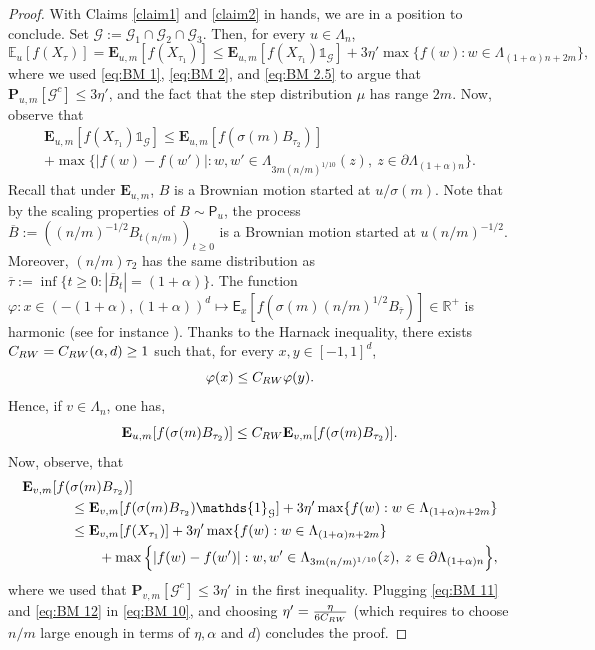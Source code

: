 \documentclass[11pt,a4paper]{article}
\numberwithin{equation}{section}
\theoremstyle{plain}
\theoremstyle{definition}
\begin{document}
\begin{proof}
With Claims \ref{claim1} and \ref{claim2} in hands, we are in a position to conclude. Set $\mathcal G:=\mathcal G_1\cap \mathcal G_2\cap \mathcal G_3$. Then, for every $u \in \Lambda_n$,
\begin{equation}
	\mathbb E_u[f(X_\tau)]=\mathbf E_{u,m}[f(X_{\tau_1})]\leq \mathbf E_{u,m}[f(X_{\tau_1})\mathds{1}_{\mathcal G}]+3\eta'\max\{f(w):w\in \Lambda_{(1+\alpha)n+2m}\},
\end{equation}
where we used \eqref{eq:BM 1}, \eqref{eq:BM 2}, and \eqref{eq:BM 2.5} to argue that $\mathbf P_{u,m}[\mathcal G^c]\leq 3\eta'$, and the fact that the step distribution $\mu$ has range $2m$. Now, observe that
\begin{multline}\label{eq:BM 10}
	\mathbf E_{u,m}[f(X_{\tau_1})\mathds{1}_{\mathcal G}]\leq \mathbf E_{u,m}[f(\sigma(m)B_{\tau_2})]\\+\max\Big\{|f(w)-f(w')|: w,w'\in \Lambda_{3m(n/m)^{1/10}}(z), \: z\in \partial \Lambda_{(1+\alpha)n}\Big\}.
\end{multline}
Recall that under $\mathbf E_{u,m}$, $B$ is a Brownian motion started at $u/\sigma(m)$. Note that by the scaling properties of $B\sim \mathsf P_u$, the process $\overline{B}:=((n/m)^{-1/2}B_{t(n/m)})_{t\geq 0}$ is a Brownian motion started at $u(n/m)^{-1/2}$. Moreover, $(n/m)\tau_2$ has the same distribution as $\overline{\tau}:=\inf\{t\geq 0: |\overline{B}_t|=(1+\alpha)\}$. The function $\varphi:x\in (-(1+\alpha),(1+\alpha))^d\mapsto \mathsf{E}_x[f(\sigma(m)(n/m)^{1/2}B_{\overline{\tau}})]\in\mathbb R^+$ is harmonic (see for instance \cite[Chapter~4.2]{karatzas1991brownian}). Thanks to the Harnack inequality, there exists $C_{\rm RW}=C_{\rm RW}(\alpha,d)\geq 1$ such that, for every $x,y\in [-1,1]^d$,
\begin{equation}
	\varphi(x)\leq C_{\rm RW} \varphi(y).
\end{equation}
Hence, if $v\in \Lambda_n$, one has,
\begin{equation}\label{eq:BM 11}
	\mathbf E_{u,m}[f(\sigma(m)B_{\tau_2})]\leq C_{\rm RW}\mathbf E_{v,m}[f(\sigma(m)B_{\tau_2})].
\end{equation}
Now, observe, that
\begin{align}
	\mathbf E_{v,m}[f(&\sigma(m)B_{\tau_2})]\notag\\&\leq \mathbf E_{v,m}[f(\sigma(m)B_{\tau_2})\mathds{1}_{\mathcal G}]+3\eta'\max\{f(w):w\in \Lambda_{(1+\alpha)n+2m}\}\notag
	\\&\leq \mathbf E_{v,m}[f(X_{\tau_1})]+3\eta'\max\{f(w):w\in \Lambda_{(1+\alpha)n+2m}\}\notag\\&\qquad+\max\Big\{|f(w)-f(w')|: w,w'\in \Lambda_{3m(n/m)^{1/10}}(z), \: z\in \partial \Lambda_{(1+\alpha)n}\Big\}\label{eq:BM 12},
\end{align}
where we used that $\mathbf P_{v,m}[\mathcal G^c]\leq 3\eta'$ in the first inequality.
Plugging \eqref{eq:BM 11} and \eqref{eq:BM 12} in \eqref{eq:BM 10}, and choosing $\eta'=\frac{\eta}{6C_{\rm RW}}$ (which requires to choose $n/m$ large enough in terms of $\eta,\alpha$ and $d$) concludes the proof.
\end{proof}
\end{document}
